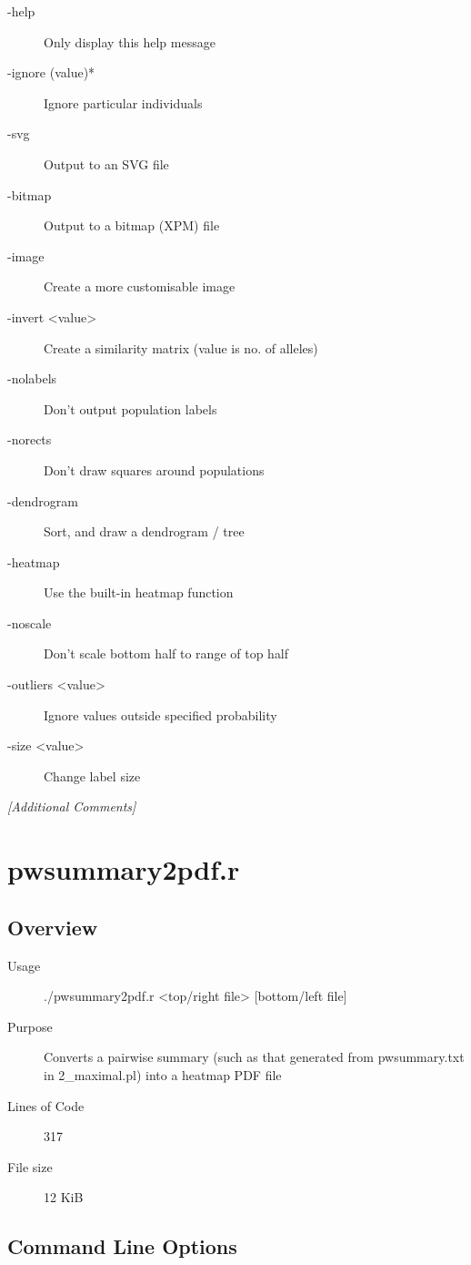 \begin{description}
\item[-help] Only display this help message
\item[-ignore (value)*] Ignore particular individuals
\item[-svg] Output to an SVG file
\item[-bitmap] Output to a bitmap (XPM) file
\item[-image] Create a more customisable image
\item[-invert <value>] Create a similarity matrix (value is no. of alleles)
\item[-nolabels] Don't output population labels
\item[-norects] Don't draw squares around populations
\item[-dendrogram] Sort, and draw a dendrogram / tree
\item[-heatmap] Use the built-in heatmap function
\item[-noscale] Don't scale bottom half to range of top half
\item[-outliers <value>] Ignore values outside specified probability
\item[-size <value>] Change label size
\end{description}

\emph{[Additional Comments]}

\section{pwsummary2pdf.r}
\label{sec:pwsummary2pdf.r}

\subsection{Overview}
\label{sec:pwsummary2pdf.r-overview}

\begin{description}
\item[Usage] ./pwsummary2pdf.r <top/right file> [bottom/left file]
\item[Purpose] Converts a pairwise summary (such as that generated from pwsummary.txt in 2_maximal.pl) into a heatmap PDF file
\item[Lines of Code] 317
\item[File size] 12 KiB
\end{description}

\subsection{Command Line Options}
\label{sec:pwsummary2pdf.r-command-line}

